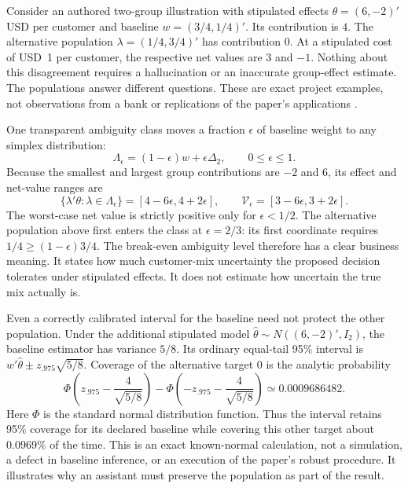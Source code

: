 Consider an authored two-group illustration with stipulated effects
$\theta=(6,-2)'$ USD per customer and baseline
$w=(3/4,1/4)'$. Its contribution is $4$. The alternative population
$\lambda=(1/4,3/4)'$ has contribution $0$. At a stipulated cost of USD~1 per
customer, the respective net values are $3$ and $-1$. Nothing about this
disagreement requires a hallucination or an inaccurate group-effect estimate.
The populations answer different questions. These are exact project examples,
not observations from a bank or replications of the paper's applications
\cite{exec22_weighted_reference}.

One transparent ambiguity class moves a fraction $\epsilon$ of baseline
weight to any simplex distribution:
\begin{equation}
 \Lambda_\epsilon=(1-\epsilon)w+\epsilon\Delta_2,
 \qquad 0\leq\epsilon\leq1.
 \label{exec22:targets-class}
\end{equation}
Because the smallest and largest group contributions are $-2$ and $6$, its
effect and net-value ranges are
\begin{equation}
 \{\lambda'\theta:\lambda\in\Lambda_\epsilon\}
   =[4-6\epsilon,4+2\epsilon],\qquad
 \mathcal V_\epsilon=[3-6\epsilon,3+2\epsilon].
 \label{exec22:targets-value}
\end{equation}
The worst-case net value is strictly positive only for $\epsilon<1/2$.
The alternative population above first enters the class at $\epsilon=2/3$:
its first coordinate requires
$1/4\geq(1-\epsilon)3/4$. The break-even ambiguity level therefore has a clear
business meaning. It states how much customer-mix uncertainty the proposed
decision tolerates under stipulated effects. It does not estimate how uncertain
the true mix actually is.

Even a correctly calibrated interval for the baseline need not protect the
other population. Under the additional stipulated model
$\widehat\theta\sim N((6,-2)',I_2)$, the baseline estimator has variance $5/8$.
Its ordinary equal-tail 95\% interval is
$w'\widehat\theta\pm z_{.975}\sqrt{5/8}$. Coverage of the alternative target
$0$ is the analytic probability
\begin{equation}
 \Phi\!\left(z_{.975}-\frac{4}{\sqrt{5/8}}\right)
 -\Phi\!\left(-z_{.975}-\frac{4}{\sqrt{5/8}}\right)
 \simeq0.0009686482.
 \label{exec22:targets-wrong}
\end{equation}
Here $\Phi$ is the standard normal distribution function. Thus the interval
retains 95\% coverage for its declared baseline while covering this other
target about 0.0969\% of the time. This is an exact known-normal calculation,
not a simulation, a defect in baseline inference, or an execution of the
paper's robust procedure. It illustrates why an assistant must preserve the
population as part of the result.

